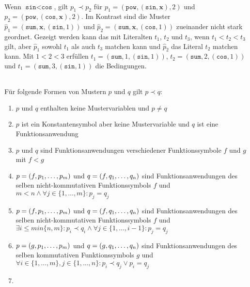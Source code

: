 \begin{beispiel}~\\
Wenn $\texttt{sin} < \texttt{cos}$, gilt $p_1 \prec p_2$ für $p_1 = (\texttt{pow}, (\texttt{sin}, \mathbf x), 2)$ und $p_2 = (\texttt{pow}, (\texttt{cos}, \mathbf x), 2)$. Im Kontrast sind die Muster $\hat p_1 = (\texttt{sum}, \mathbf x, (\texttt{sin}, 1))$ und $\hat p_2 = (\texttt{sum}, \mathbf x, (\texttt{cos}, 1))$ zueinander nicht stark geordnet. Gezeigt werden kann das mit Literalten $t_1$, $t_2$ und $t_3$, wenn ${t_1 < t_2 < t_3}$ gilt, aber $\hat p_1$ sowohl $t_1$ als auch $t_3$ matchen kann und $\hat p_2$ das Literal $t_2$ matchen kann. Mit $1 < 2 < 3$ erfüllen $t_1 = (\texttt{sum}, 1, (\texttt{sin}, 1))$, $t_2 = (\texttt{sum}, 2, (\texttt{cos}, 1))$ und $t_1 = (\texttt{sum}, 3, (\texttt{sin}, 1))$ die Bedingungen.
\end{beispiel}


\begin{lemma}~\\
Für folgende Formen von Mustern $p$ und $q$ gilt $p \prec q$:
\begin{enumerate}
	\item{$p$ und $q$ enthalten keine Mustervariablen und $p \neq q$}
	
	\item{$p$ ist ein Konstantensymbol aber keine Mustervariable und $q$ ist eine Funktionsanwendung}
	
	\item{$p$ und $q$ sind Funktionsanwendungen verschiedener Funktionssymbole $f$ und $g$ mit $f < g$}
	
	\item{$p = (f, {p}_{1}, \dots, {p}_{m})$ und $q = (f, {q}_{1}, \dots, {q}_{n})$ sind Funktionsanwendungen des selben nicht-kommutativen Funktionssymbols $f$ und $m < n \land \forall j \in \{1, \dots, m\} \colon p_j = q_j$}
	
	\item{$p = (f, {p}_{1}, \dots, {p}_{m})$ und $q = (f, {q}_{1}, \dots, {q}_{n})$ sind Funktionsanwendungen des selben nicht-kommutativen Funktionssymbols $f$ und $\exists i \leq min\{n, m\} \colon p_i \prec q_i \land \forall j \in \{1, \dots, i  - 1\} \colon p_j = q_j$}
	
	\item{$p = (g, {p}_{1}, \dots, {p}_{m})$ und $q = (g, {q}_{1}, \dots, {q}_{n})$ sind Funktionsanwendungen des selben kommutativen Funktionssymbols $g$ und $\forall i \in \{1, \dots, m\}, j \in \{1, \dots, n\} \colon p_i \prec q_j \lor p_i = q_j$}
	
	\item{}
\end{enumerate}
\end{lemma}

